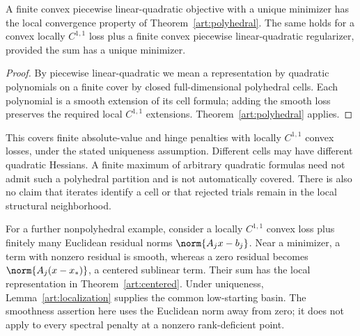 \begin{corollary}\label{art:plq}
A finite convex piecewise linear-quadratic objective with a unique minimizer
has the local convergence property of Theorem~\ref{art:polyhedral}.
The same holds for a convex locally $C^{1,1}$ loss plus a finite convex
piecewise linear-quadratic regularizer, provided the sum has a unique minimizer.
\end{corollary}
\begin{proof}
By piecewise linear-quadratic we mean a representation by quadratic polynomials
on a finite cover by closed full-dimensional polyhedral cells. Each polynomial is a smooth
extension of its cell formula; adding the smooth loss preserves the required
local $C^{1,1}$ extensions. Theorem~\ref{art:polyhedral} applies.
\end{proof}

This covers finite absolute-value and hinge penalties with locally $C^{1,1}$ convex losses,
under the stated uniqueness assumption. Different cells may have different
quadratic Hessians. A finite maximum of arbitrary quadratic formulas need not
admit such a polyhedral partition and is not automatically covered.
There is also no claim that iterates identify a cell or that rejected trials
remain in the local structural neighborhood.

For a further nonpolyhedral example, consider a locally $C^{1,1}$ convex loss plus finitely
many Euclidean residual norms $\norm{A_jx-b_j}$. Near a minimizer, a term with
nonzero residual is smooth, whereas a zero residual becomes
$\norm{A_j(x-x_*)}$, a centered sublinear term. Their sum has the local
representation in Theorem~\ref{art:centered}. Under uniqueness,
Lemma~\ref{art:localization} supplies the common low-starting basin.
The smoothness assertion here uses the Euclidean norm away from zero;
it does not apply to every spectral penalty at a nonzero rank-deficient point.
